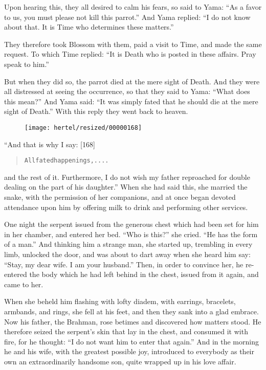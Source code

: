 \documentclass[article, twoside, 10pt]{memoir}
\renewenvironment{verbatim}{%
\begin{quote}%
\vskip -10pt%
\begin{alltt}\normalfont\small}{\end{alltt}%
\end{quote}%
\vskip -10pt
} %
\begin{document}
Upon hearing this, they all desired to calm his fears, so said to
Yama: ``As a favor to us, you must please not kill this parrot.''
And Yama replied:
``I do not know about that. It is Time who determines these matters.''

They therefore took Blossom with them, paid a visit to Time, and
made the same request. To which Time replied:
``It is Death who is posted in these affairs. Pray speak to him.''

But when they did so, the parrot died at the mere sight of Death.
And they were all distressed at seeing the occurrence, so that they
said to Yama: ``What does this mean?'' And Yama said:
``It was simply fated that he should die at the mere sight of Death.''
With this reply they went back to heaven.

\begin{figure}[p]\texttt{[image: hertel/resized/00000168]}\end{figure}“And that is why I say: [168]

\begin{verbatim}
All fated happenings, ....
\end{verbatim}
and the rest of it. Furthermore, I do not wish my father reproached
for double dealing on the part of his daughter.” When she had said
this, she married the snake, with the permission of her companions,
and at once began devoted attendance upon him by offering milk to
drink and performing other services.

One night the serpent issued from the generous chest which had been
set for him in her chamber, and entered her bed. ``Who is this?''
she cried. ``He has the form of a man.'' And thinking him a strange
man, she started up, trembling in every limb, unlocked the door,
and was about to dart away when she heard him say:
``Stay, my dear wife. I am your husband.'' Then, in order to
convince her, he re-entered the body which he had left behind in
the chest, issued from it again, and came to her.

When she beheld him flashing with lofty diadem, with earrings,
bracelets, armbands, and rings, she fell at his feet, and then they
sank into a glad embrace. Now his father, the Brahman, rose betimes
and discovered how matters stood. He therefore seized the serpent's
skin that lay in the chest, and consumed it with fire, for he
thought: ``I do not want him to enter that again.'' And in the
morning he and his wife, with the greatest possible joy, introduced
to everybody as their own an extraordinarily handsome son, quite
wrapped up in his love affair.
\end{document}
